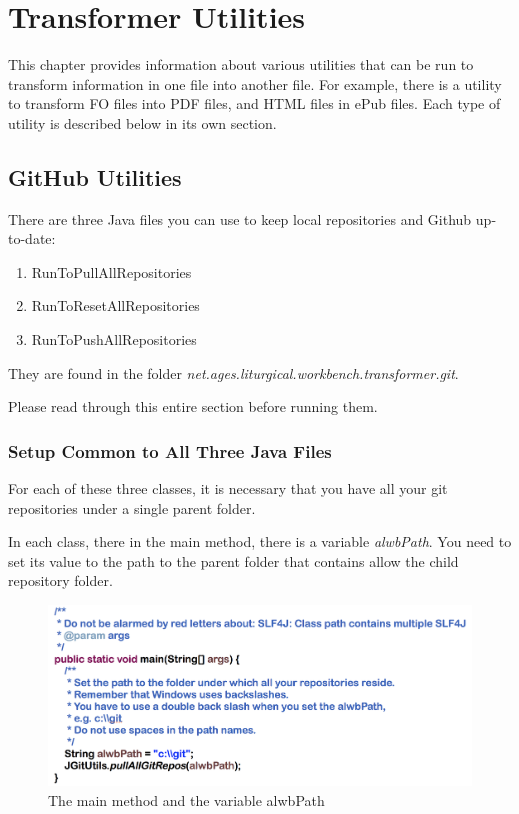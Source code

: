 \documentclass[]{memoir}
\begin{document}
\chapter{Transformer Utilities}

This chapter provides information about various utilities that can be run to transform information in one file into another file.  For example, there is a utility to transform FO files into PDF files, and HTML files in ePub files.  Each type of utility is described below in its own section.

\section{GitHub Utilities}

There are three Java files you can use to keep local repositories and Github up-to-date:

\begin{enumerate}
    \item RunToPullAllRepositories
    \item RunToResetAllRepositories
    \item RunToPushAllRepositories
\end{enumerate}

They are found in the folder \textit{net.ages.liturgical.workbench.transformer.git}.

Please read through this entire section before running them.

\subsection{Setup Common to All Three Java Files}

For each of these three classes, it is necessary that you have all your git repositories under a single parent folder. 

In each class, there in the main method, there is a variable \textit{alwbPath}.  You need to set its value to the path to the parent folder that contains allow the child repository folder.

\begin{figure}[h!]

  \begin{center}
\includegraphics[scale=0.25]{alwb-user-guide/system/images/ioc-liturgical-db-public-app/alwbPath.png}
\end{center}
  \caption{The main method and the variable alwbPath}
\end{figure}
\end{document}
